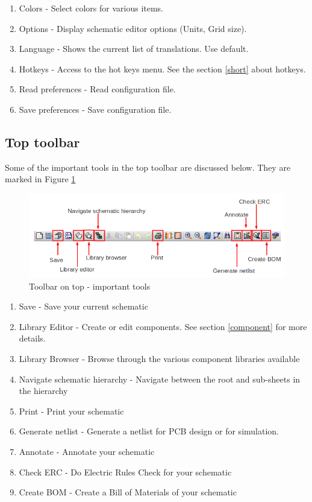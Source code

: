 \begin{enumerate}
\begin{enumerate}
\item Colors - Select colors for various items.
\item Options - Display schematic editor options (Units, Grid size).
\item Language - Shows the current list of translations. Use default. 
\item Hotkeys - Access to the hot keys menu. See the section \ref{short} about hotkeys.
\item Read preferences - Read configuration file.
\item Save preferences - Save configuration file.
\end{enumerate}

\end{enumerate} 

\subsection{Top toolbar}
Some of the important tools in the top toolbar are discussed below. They are marked in Figure \ref{eeschem2}
\begin{figure}
\centering
\includegraphics[width=\textwidth]{figures/eeschema2_mod}
\caption{Toolbar on top - important tools}
\label{eeschem2}
\end{figure}
\begin{enumerate}
\item Save - Save your current schematic
\item Library Editor - Create or edit components. See section \ref{component} for more details.
\item Library Browser - Browse through the various component libraries available
\item Navigate schematic hierarchy - Navigate between the root and sub-sheets in the hierarchy
\item Print - Print your schematic
\item Generate netlist - Generate a netlist for PCB design or for simulation.
\item Annotate - Annotate your schematic
\item Check ERC - Do Electric Rules Check for your schematic
\item Create BOM - Create a Bill of Materials of your schematic
\end{enumerate}

